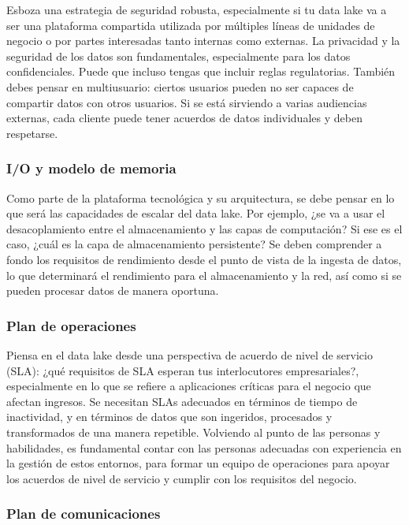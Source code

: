 \documentclass[preprint,12pt]{elsarticle}
\begin{document}
Esboza una estrategia de seguridad robusta, especialmente si tu data lake va a ser una plataforma compartida utilizada por múltiples líneas de unidades de negocio o por partes interesadas tanto internas como externas. La privacidad y la seguridad de los datos son fundamentales, especialmente para los datos confidenciales. Puede que incluso tengas que incluir reglas regulatorias. También debes pensar en multiusuario: ciertos usuarios pueden no ser capaces de compartir datos con otros usuarios. Si se está sirviendo a varias audiencias externas, cada cliente puede tener acuerdos de datos individuales y deben respetarse.

\subsubsection{I/O y modelo de memoria}

Como parte de la plataforma tecnológica y su arquitectura, se debe pensar en lo que será las capacidades de escalar del data lake. Por ejemplo, ¿se va a usar el desacoplamiento entre el almacenamiento y las capas de computación? Si ese es el caso, ¿cuál es la capa de almacenamiento persistente? Se deben comprender a fondo los requisitos de rendimiento desde el punto de vista de la ingesta de datos, lo que determinará el rendimiento para el almacenamiento y la red, así como si se pueden procesar datos de manera oportuna.

\subsubsection{Plan de operaciones}

Piensa en el data lake desde una perspectiva de acuerdo de nivel de servicio (SLA): ¿qué requisitos de SLA esperan tus interlocutores empresariales?, especialmente en lo que se refiere a aplicaciones críticas para el negocio que afectan ingresos. Se necesitan SLAs adecuados en términos de tiempo de inactividad, y en términos de datos que son ingeridos, procesados y transformados de una manera repetible. Volviendo al punto de las personas y habilidades, es fundamental contar con las personas adecuadas con experiencia en la gestión de estos entornos, para formar un equipo de operaciones para apoyar los acuerdos de nivel de servicio y cumplir con los requisitos del negocio.

\subsubsection{Plan de comunicaciones}
\end{document}
